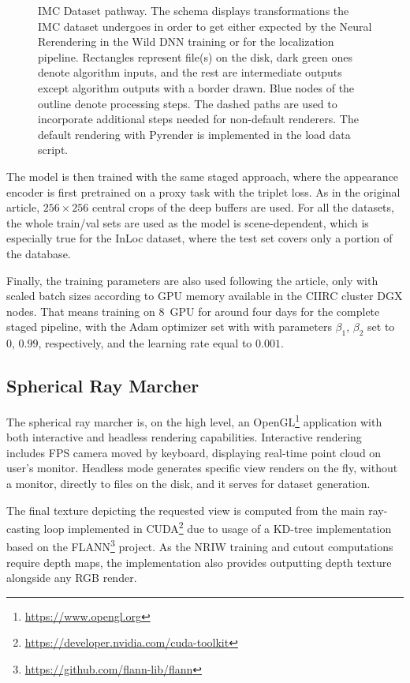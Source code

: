 \begin{figure}
    \centering
    
    \caption[IMC Dataset pathway]{IMC Dataset pathway. The schema
    displays transformations the IMC dataset undergoes in order to get either  expected by the Neural Rerendering in the Wild DNN training or 
    for the localization pipeline. Rectangles represent file(s) on the disk, dark green
    ones denote algorithm inputs, and the rest are intermediate outputs except algorithm
    outputs with a border drawn. Blue nodes of the outline denote processing steps. The
    dashed paths are used to incorporate additional steps needed for non-default
    renderers.  The default rendering with Pyrender is implemented in the load data
    script.}
    \label{fig:imc_dset_pathway}
\end{figure}

The model is then trained with the same staged approach, where the appearance encoder is
first pretrained on a proxy task with the triplet loss. As in the original article,
$256\times256$ central crops of the deep buffers are used. For all the datasets, the whole
train/val sets are used as the model is scene-dependent, which is especially true for the
InLoc dataset, where the test set covers only a portion of the database.

Finally, the training parameters are also used following the article, only with scaled
batch sizes according to GPU memory available in the CIIRC cluster DGX nodes. That means
training on 8~GPU for around four days for the complete staged pipeline, with the Adam optimizer
set with with parameters $\beta_1$, $\beta_2$ set to $0$, $0.99$, respectively, and
the learning rate equal to $0.001$.

\subsection{Spherical Ray Marcher}

The spherical ray marcher is, on the high level, an
OpenGL\footnote{\url{https://www.opengl.org}} application with both interactive and
headless rendering capabilities. Interactive rendering includes FPS camera moved by
keyboard, displaying real-time point cloud on user's monitor.  Headless mode generates
specific view renders on the fly, without a monitor, directly to files on the disk, and it
serves for dataset generation.

The final texture depicting the requested view is computed from the main ray-casting loop
implemented in CUDA\footnote{\url{https://developer.nvidia.com/cuda-toolkit}} due to usage
of a KD-tree implementation based on the
FLANN\footnote{\url{https://github.com/flann-lib/flann}} project. As the NRIW training and
cutout computations require depth maps, the implementation also provides outputting depth
texture alongside any RGB render.

